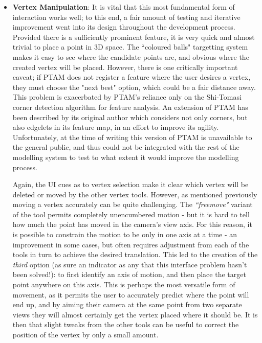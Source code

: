 \documentclass[a4paper,10pt]{article}
\begin{document}
\begin{itemize}
\item{\textbf{Vertex Manipulation}: It is vital that this most fundamental form of interaction works well; to this end, a fair amount of testing and iterative improvement went into its design throughout the development process. Provided there is a sufficiently prominent feature, it is very quick and almost trivial to place a point in 3D space. The ``coloured balls" targetting system makes it easy to see where the candidate points are, and obvious where the created vertex will be placed. However, there is one critically important caveat; if PTAM does not register a feature where the user desires a vertex, they must choose the "next best" option, which could be a fair distance away. This problem is exacerbated by PTAM's reliance only on the Shi-Tomasi \cite{shitomasi} corner detection algorithm for feature analysis. An extension of PTAM has been described by its original author \cite{ptamedges} which considers not only corners, but also edgelets in its feature map, in an effort to improve its agility. Unfortunately, at the time of writing this version of PTAM is unavailable to the general public, and thus could not be integrated with the rest of the modelling system to test to what extent it would improve the modelling process.

Again, the UI cues as to vertex selection make it clear which vertex will be deleted or moved by the other vertex tools. However, as mentioned previously moving a vertex accurately can be quite challenging. The \textit{``freemove"} variant of the tool permits completely unencumbered motion - but it is hard to tell how much the point has moved in the camera's view axis. For this reason, it is possible to constrain the motion to be only in one axis at a time - an improvement in some cases, but often requires adjustment from each of the tools in turn to achieve the desired translation. This led to the creation of the \textit{third} option (as sure an indicator as any that this interface problem hasn't been solved!): to first identify an axis of motion, and then place the target point anywhere on this axis. This is perhaps the most versatile form of movement, as it permits the user to accurately predict where the point will end up, and by aiming their camera at the same point from two separate views they will almost certainly get the vertex placed where it should be. It is then that slight tweaks from the other tools can be useful to correct the position of the vertex by only a small amount.
}


\end{itemize}
\end{document}
